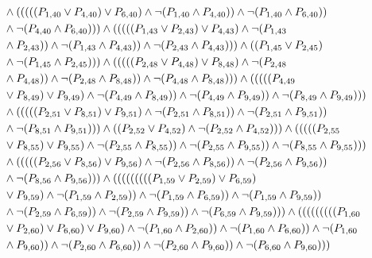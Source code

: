 \documentclass[10pt]{article}
\begin{document}
\begin{align*}
& \land (((((\PV{1,40} \lor \PV{4,40}) \lor \PV{6,40}) \land \lnot(\PV{1,40} \land \PV{4,40})) \land \lnot(\PV{1,40} \land \PV{6,40})) \\
& \land \lnot(\PV{4,40} \land \PV{6,40}))) \land (((((\PV{1,43} \lor \PV{2,43}) \lor \PV{4,43}) \land \lnot(\PV{1,43} \\
& \land \PV{2,43})) \land \lnot(\PV{1,43} \land \PV{4,43})) \land \lnot(\PV{2,43} \land \PV{4,43}))) \land ((\PV{1,45} \lor \PV{2,45}) \\
& \land \lnot(\PV{1,45} \land \PV{2,45}))) \land (((((\PV{2,48} \lor \PV{4,48}) \lor \PV{8,48}) \land \lnot(\PV{2,48} \\
& \land \PV{4,48})) \land \lnot(\PV{2,48} \land \PV{8,48})) \land \lnot(\PV{4,48} \land \PV{8,48}))) \land (((((\PV{4,49} \\
& \lor \PV{8,49}) \lor \PV{9,49}) \land \lnot(\PV{4,49} \land \PV{8,49})) \land \lnot(\PV{4,49} \land \PV{9,49})) \land \lnot(\PV{8,49} \land \PV{9,49}))) \\
& \land (((((\PV{2,51} \lor \PV{8,51}) \lor \PV{9,51}) \land \lnot(\PV{2,51} \land \PV{8,51})) \land \lnot(\PV{2,51} \land \PV{9,51})) \\
& \land \lnot(\PV{8,51} \land \PV{9,51}))) \land ((\PV{2,52} \lor \PV{4,52}) \land \lnot(\PV{2,52} \land \PV{4,52}))) \land (((((\PV{2,55} \\
& \lor \PV{8,55}) \lor \PV{9,55}) \land \lnot(\PV{2,55} \land \PV{8,55})) \land \lnot(\PV{2,55} \land \PV{9,55})) \land \lnot(\PV{8,55} \land \PV{9,55}))) \\
& \land (((((\PV{2,56} \lor \PV{8,56}) \lor \PV{9,56}) \land \lnot(\PV{2,56} \land \PV{8,56})) \land \lnot(\PV{2,56} \land \PV{9,56})) \\
& \land \lnot(\PV{8,56} \land \PV{9,56}))) \land (((((((((\PV{1,59} \lor \PV{2,59}) \lor \PV{6,59}) \\
& \lor \PV{9,59}) \land \lnot(\PV{1,59} \land \PV{2,59})) \land \lnot(\PV{1,59} \land \PV{6,59})) \land \lnot(\PV{1,59} \land \PV{9,59})) \\
& \land \lnot(\PV{2,59} \land \PV{6,59})) \land \lnot(\PV{2,59} \land \PV{9,59})) \land \lnot(\PV{6,59} \land \PV{9,59}))) \land (((((((((\PV{1,60} \\
& \lor \PV{2,60}) \lor \PV{6,60}) \lor \PV{9,60}) \land \lnot(\PV{1,60} \land \PV{2,60})) \land \lnot(\PV{1,60} \land \PV{6,60})) \land \lnot(\PV{1,60} \\
& \land \PV{9,60})) \land \lnot(\PV{2,60} \land \PV{6,60})) \land \lnot(\PV{2,60} \land \PV{9,60})) \land \lnot(\PV{6,60} \land \PV{9,60}))) \\

\end{align*}
\end{document}
